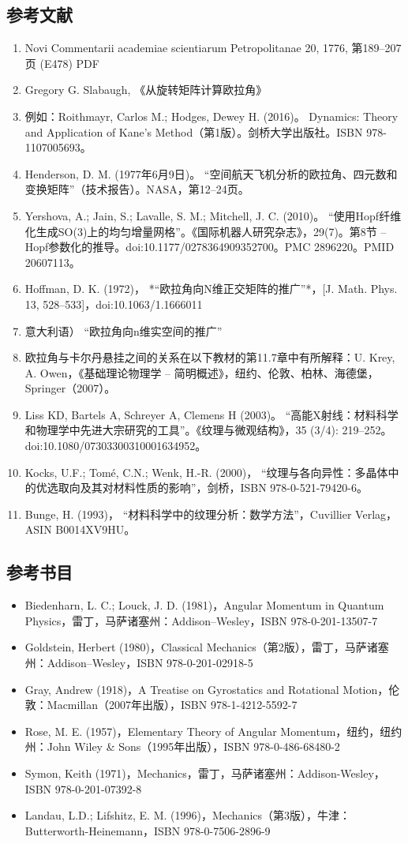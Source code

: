 \subsection{参考文献}
\begin{enumerate}
\item Novi Commentarii academiae scientiarum Petropolitanae 20, 1776, 第189–207页 (E478) PDF
\item Gregory G. Slabaugh, 《从旋转矩阵计算欧拉角》
\item 例如：Roithmayr, Carlos M.; Hodges, Dewey H. (2016)。 Dynamics: Theory and Application of Kane's Method（第1版）。剑桥大学出版社。ISBN 978-1107005693。
\item Henderson, D. M. (1977年6月9日)。 “空间航天飞机分析的欧拉角、四元数和变换矩阵”（技术报告）。NASA，第12–24页。
\item Yershova, A.; Jain, S.; Lavalle, S. M.; Mitchell, J. C. (2010)。 “使用Hopf纤维化生成SO(3)上的均匀增量网格”。《国际机器人研究杂志》，29(7)。第8节 – Hopf参数化的推导。doi:10.1177/0278364909352700。PMC 2896220。PMID 20607113。
\item Hoffman, D. K. (1972)， *“欧拉角向N维正交矩阵的推广”*，[J. Math. Phys. 13, 528–533]，doi:10.1063/1.1666011
\item 意大利语） “欧拉角向n维实空间的推广”
\item 欧拉角与卡尔丹悬挂之间的关系在以下教材的第11.7章中有所解释：U. Krey, A. Owen，《基础理论物理学 – 简明概述》，纽约、伦敦、柏林、海德堡，Springer（2007）。
\item Liss KD, Bartels A, Schreyer A, Clemens H (2003)。 “高能X射线：材料科学和物理学中先进大宗研究的工具”。《纹理与微观结构》，35 (3/4): 219–252。doi:10.1080/07303300310001634952。
\item Kocks, U.F.; Tomé, C.N.; Wenk, H.-R. (2000)， “纹理与各向异性：多晶体中的优选取向及其对材料性质的影响”，剑桥，ISBN 978-0-521-79420-6。
\item Bunge, H. (1993)， “材料科学中的纹理分析：数学方法”，Cuvillier Verlag，ASIN B0014XV9HU。
\end{enumerate}
\subsection{参考书目}
\begin{itemize}
\item Biedenharn, L. C.; Louck, J. D. (1981)，Angular Momentum in Quantum Physics，雷丁，马萨诸塞州：Addison–Wesley，ISBN 978-0-201-13507-7  
\item Goldstein, Herbert (1980)，Classical Mechanics（第2版），雷丁，马萨诸塞州：Addison–Wesley，ISBN 978-0-201-02918-5  
\item Gray, Andrew (1918)，A Treatise on Gyrostatics and Rotational Motion，伦敦：Macmillan（2007年出版），ISBN 978-1-4212-5592-7  
\item Rose, M. E. (1957)，Elementary Theory of Angular Momentum，纽约，纽约州：John Wiley & Sons（1995年出版），ISBN 978-0-486-68480-2  
\item Symon, Keith (1971)，Mechanics，雷丁，马萨诸塞州：Addison-Wesley，ISBN 978-0-201-07392-8  
\item Landau, L.D.; Lifshitz, E. M. (1996)，Mechanics（第3版），牛津：Butterworth-Heinemann，ISBN 978-0-7506-2896-9
\end{itemize}
